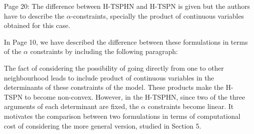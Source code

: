 \documentclass{article}
\newenvironment{reviewer}{\setcounter{pointcounter}{1}}{}
\newcommand{\point}{\text{{\selectfont \thepointcounter} \stepcounter{pointcounter}}}
\begin{document}
\begin{reviewer}
		\begin{tcolorbox}[breakable,enhanced,coltitle=black,colback=red!5!white,colframe=red!75!black,title=\textbf{Answer R1.\point},borderline={1pt}{0pt}{black},boxrule=0pt]

		\end{tcolorbox}
		
		\begin{itshape}
			Page 20: The difference between H-TSPHN and H-TSPN is given but the authors have to describe the $\alpha$-constraints, specially the product of continuous variables obtained for this case.
		\end{itshape}
		
		\begin{tcolorbox}[breakable,enhanced,coltitle=black,colback=red!5!white,colframe=red!75!black,title=\textbf{Answer R1.\point},borderline={1pt}{0pt}{black},boxrule=0pt]
		In Page 10, we have described the difference between these formulations in terms of the $\alpha$ constraints by including the following paragraph:
		
		\medskip
		
		The fact of considering the possibility of going directly from one to other neighbourhood leads to include product of continuous variables in the determinants of these constraints of the model. These products make the H-TSPN to become non-convex. However, in the H-TSPHN, since two of the three arguments of each determinant are fixed, the $\alpha$ constraints become linear. It motivates the comparison between two formulations in terms of computational cost of considering the more general version, studied in Section 5.
		\end{tcolorbox}
		

\end{reviewer}
\end{document}
